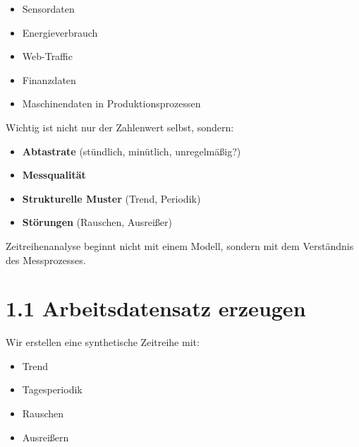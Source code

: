 \documentclass[
  ngerman,
  letterpaper,
  DIV=11]{scrreprt}
\providecommand{\tightlist}{%
  \setlength{\itemsep}{0pt}\setlength{\parskip}{0pt}}
\begin{document}
\begin{itemize}
\tightlist
\item
  Sensordaten
\item
  Energieverbrauch
\item
  Web-Traffic
\item
  Finanzdaten
\item
  Maschinendaten in Produktionsprozessen
\end{itemize}

Wichtig ist nicht nur der Zahlenwert selbst, sondern:

\begin{itemize}
\tightlist
\item
  \textbf{Abtastrate} (stündlich, minütlich, unregelmäßig?)
\item
  \textbf{Messqualität}
\item
  \textbf{Strukturelle Muster} (Trend, Periodik)
\item
  \textbf{Störungen} (Rauschen, Ausreißer)
\end{itemize}

\begin{tcolorbox}[enhanced jigsaw, titlerule=0mm, title=\textcolor{quarto-callout-note-color}{\faInfo}\hspace{0.5em}{Merke}, bottomrule=.15mm, opacityback=0, colbacktitle=quarto-callout-note-color!10!white, coltitle=black, opacitybacktitle=0.6, colframe=quarto-callout-note-color-frame, toprule=.15mm, leftrule=.75mm, arc=.35mm, rightrule=.15mm, breakable, bottomtitle=1mm, colback=white, toptitle=1mm, left=2mm]

Zeitreihenanalyse beginnt nicht mit einem Modell, sondern mit dem
Verständnis des Messprozesses.

\end{tcolorbox}

\section{1.1 Arbeitsdatensatz erzeugen}\label{arbeitsdatensatz-erzeugen}

Wir erstellen eine synthetische Zeitreihe mit:

\begin{itemize}
\tightlist
\item
  Trend\\
\item
  Tagesperiodik\\
\item
  Rauschen\\
\item
  Ausreißern
\end{itemize}
\end{document}
